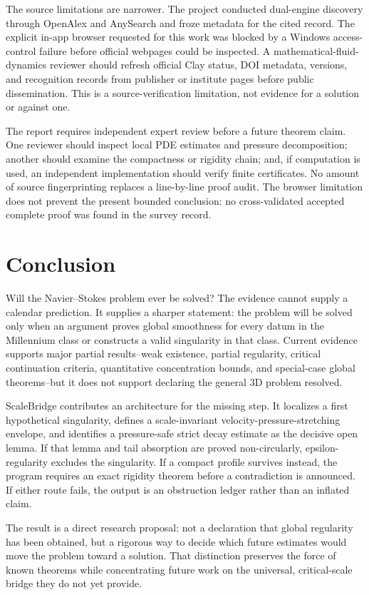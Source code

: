 \documentclass[conference]{../../../../Conference-LaTeX-template_10-17-19/IEEEtran}
\begin{document}
The source limitations are narrower. The project conducted dual-engine discovery through OpenAlex and AnySearch and froze metadata for the cited record. The explicit in-app browser requested for this work was blocked by a Windows access-control failure before official webpages could be inspected. A mathematical-fluid-dynamics reviewer should refresh official Clay status, DOI metadata, versions, and recognition records from publisher or institute pages before public dissemination. This is a source-verification limitation, not evidence for a solution or against one.

The report requires independent expert review before a future theorem claim. One reviewer should inspect local PDE estimates and pressure decomposition; another should examine the compactness or rigidity chain; and, if computation is used, an independent implementation should verify finite certificates. No amount of source fingerprinting replaces a line-by-line proof audit. The browser limitation does not prevent the present bounded conclusion: no cross-validated accepted complete proof was found in the survey record.

\section{Conclusion}
Will the Navier--Stokes problem ever be solved? The evidence cannot supply a calendar prediction. It supplies a sharper statement: the problem will be solved only when an argument proves global smoothness for every datum in the Millennium class or constructs a valid singularity in that class. Current evidence supports major partial results--weak existence, partial regularity, critical continuation criteria, quantitative concentration bounds, and special-case global theorems--but it does not support declaring the general $3$D problem resolved.

ScaleBridge contributes an architecture for the missing step. It localizes a first hypothetical singularity, defines a scale-invariant velocity-pressure-stretching envelope, and identifies a pressure-safe strict decay estimate as the decisive open lemma. If that lemma and tail absorption are proved non-circularly, epsilon-regularity excludes the singularity. If a compact profile survives instead, the program requires an exact rigidity theorem before a contradiction is announced. If either route fails, the output is an obstruction ledger rather than an inflated claim.

The result is a direct research proposal: not a declaration that global regularity has been obtained, but a rigorous way to decide which future estimates would move the problem toward a solution. That distinction preserves the force of known theorems while concentrating future work on the universal, critical-scale bridge they do not yet provide.
\end{document}
